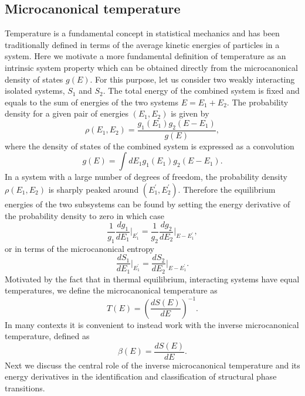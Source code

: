 \documentclass[12pt]{report}
\begin{document}
\subsection{Microcanonical temperature}
Temperature is a fundamental concept in statistical mechanics and has been traditionally defined in terms of the average kinetic energies of particles in a system. Here we motivate a more fundamental definition of temperature as an intrinsic system property which can be obtained directly from the microcanonical density of states $g(E)$. For this purpose, let us consider two weakly interacting isolated systems, $S_{1}$ and $S_{2}$. The total energy of the combined system is fixed and equals to the sum of energies of the two systems $E = E_{1} + E_{2}$. The probability density for a given pair of energies $(E_{1},E_{2})$ is given by 
\begin{equation}
\rho(E_{1},E_{2}) = \frac{g_{1}(E_{1})g_{2}(E-E_{1})}{g(E)},
\end{equation}
where the density of states of the combined system is expressed as a convolution
\begin{equation}
g(E) = \int dE_{1}g_{1}(E_{1})g_{2}(E-E_{1}).
\end{equation}
In a system with a large number of degrees of freedom, the probability density $\rho(E_{1},E_{2})$ is sharply peaked around $(E^{'}_{1},E^{'}_{2})$. Therefore the equilibrium energies of the two subsystems can be found by setting the energy derivative of the probability density to zero in which case 
\begin{equation}
\frac{1}{g_{1}}\frac{dg_{1}}{dE_{1}}\bigg|_{E^{'}_{1}} = \frac{1}{g_{2}}\frac{dg_{2}}{dE_{2}}\bigg|_{E - E^{'}_{1}},
\end{equation}
or in terms of the microcanonical entropy
\begin{equation}
\frac{dS_{1}}{dE_1}\bigg|_{E^{'}_{1}} = \frac{dS_{2}}{dE_{2}}\bigg|_{E - E^{'}_{1}}.
\end{equation}
Motivated by the fact that in thermal equilibrium, interacting systems have equal temperatures, we define the microcanonical temperature as 
\begin{equation}
T(E) = \left(\frac{dS(E)}{dE}\right)^{-1}.
\end{equation}
In many contexts it is convenient to instead work with the inverse microcanonical temperature, defined as 
\begin{equation}
\beta(E) = \frac{dS(E)}{dE}.
\end{equation}
Next we discuss the central role of the inverse microcanonical temperature and its energy derivatives in the identification and classification of structural phase transitions.
\end{document}
